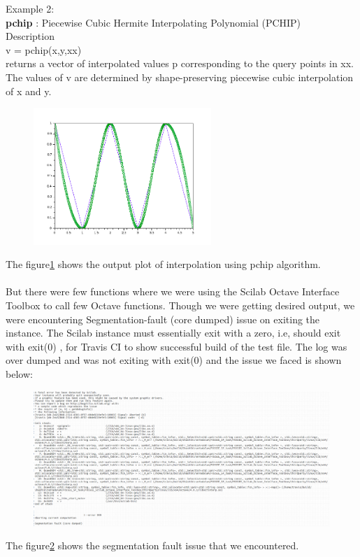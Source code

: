 \documentclass[12pt,a4paper]{report}
\begin{document}
Example 2:\\
\textbf{pchip} : Piecewise Cubic Hermite Interpolating Polynomial (PCHIP)\\
Description\\
v = pchip(x,y,xx) \\
returns a vector of interpolated values p corresponding to the query points in xx. The values of v are determined by shape-preserving piecewise cubic interpolation of x and y.

\begin{figure}[H]
\centering
\includegraphics[width = 0.6\textwidth]{pchip.png}
\label{pchip}
\end{figure}
The figure\ref{pchip} shows the output plot of interpolation using pchip algorithm. \\\\

But there were few functions where we were using the Scilab Octave Interface Toolbox to call few Octave functions. Though we were getting desired output, we were encountering Segmentation-fault (core dumped) issue on exiting the instance. The Scilab instance must essentially exit with a zero, i.e, should exit with exit(0) , for Travis CI to show successful build of the test file. The log was over dumped and was not exiting with exit(0) and the issue we faced is shown below:\\


\begin{figure}[H]
\centering
\includegraphics[width = \linewidth]{segfault.png}
\label{segfault}
\end{figure}
The figure\ref{segfault} shows the segmentation fault issue that we encountered. 
\end{document}
